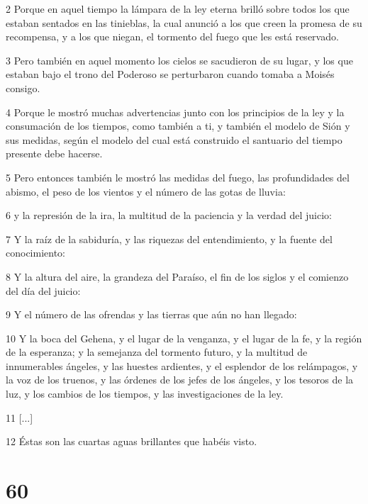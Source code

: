 \par 2 Porque en aquel tiempo la lámpara de la ley eterna brilló sobre todos los que estaban sentados en las tinieblas, la cual anunció a los que creen la promesa de su recompensa, y a los que niegan, el tormento del fuego que les está reservado.

\par 3 Pero también en aquel momento los cielos se sacudieron de su lugar, y los que estaban bajo el trono del Poderoso se perturbaron cuando tomaba a Moisés consigo.

\par 4 Porque le mostró muchas advertencias junto con los principios de la ley y la consumación de los tiempos, como también a ti, y también el modelo de Sión y sus medidas, según el modelo del cual está construido el santuario del tiempo presente debe hacerse.

\par 5 Pero entonces también le mostró las medidas del fuego, las profundidades del abismo, el peso de los vientos y el número de las gotas de lluvia:

\par 6 y la represión de la ira, la multitud de la paciencia y la verdad del juicio:

\par 7 Y la raíz de la sabiduría, y las riquezas del entendimiento, y la fuente del conocimiento:

\par 8 Y la altura del aire, la grandeza del Paraíso, el fin de los siglos y el comienzo del día del juicio:

\par 9 Y el número de las ofrendas y las tierras que aún no han llegado:

\par 10 Y la boca del Gehena, y el lugar de la venganza, y el lugar de la fe, y la región de la esperanza; y la semejanza del tormento futuro, y la multitud de innumerables ángeles, y las huestes ardientes, y el esplendor de los relámpagos, y la voz de los truenos, y las órdenes de los jefes de los ángeles, y los tesoros de la luz, y los cambios de los tiempos, y las investigaciones de la ley.

\par 11 [...]

\par 12 Éstas son las cuartas aguas brillantes que habéis visto.

\chapter{60}

